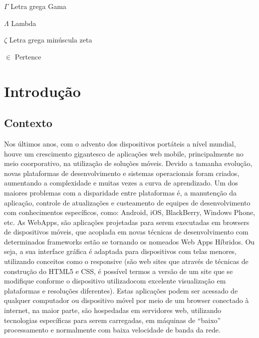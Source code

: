 \documentclass[12pt,openright,twoside,a4paper,english,french,spanish,brazil]{abntex2}
\begin{document}
\begin{simbolos}
  \item[$ \Gamma $] Letra grega Gama
  \item[$ \Lambda $] Lambda
  \item[$ \zeta $] Letra grega minúscula zeta
  \item[$ \in $] Pertence
\end{simbolos}


\tableofcontents 


\textual

\chapter*[Introdução]{Introdução}
\section*{Contexto}

Nos últimos anos, com o advento dos dispositivos portáteis a nível mundial, houve um crescimento gigantesco de aplicações web mobile, principalmente no meio coorporativo, na utilização de soluções móveis. Devido a tamanha evolução, novas plataformas de desenvolvimento e sistemas operacionais foram criados, aumentando a complexidade e muitas vezes a curva de aprendizado. Um dos maiores problemas com a disparidade entre plataformas é, a manutenção da aplicação, controle de atualizações e custeamento de equipes de desenvolvimento com conhecimentos específicos, como: Android, iOS, BlackBerry, Windows Phone, etc.
As WebApps, são aplicações projetadas para serem executadas em browsers de dispositivos móveis, que acoplada em novas técnicas de desenvolvimento com determinados frameworks estão se tornando os nomeados Web Apps Híbridos. Ou seja, a sua interface gráfica é adaptada para dispositivos com telas menores, utilizando conceitos como o responsive (são web sites que através de técnicas de construção do HTML5 e CSS, é possível termos a versão de um site que se modifique conforme o dispositivo utilizadocom excelente visualização em plataformas e resoluções diferentes). Estas aplicações podem ser acessado de qualquer computador ou dispositivo móvel por meio de um browser conectado à internet, na maior parte, são hospedadas em servidores web, utilizando tecnologias específicas para serem carregadas, em máquinas de “baixo” processamento e normalmente com baixa velocidade de banda da rede.
\end{document}
